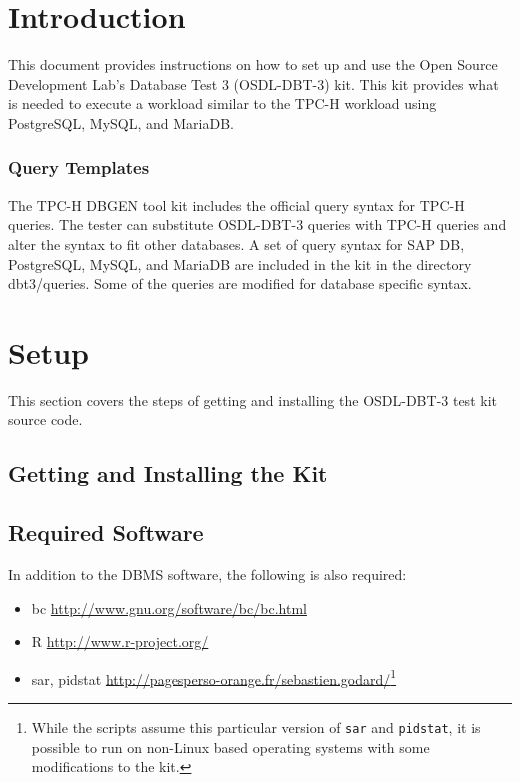 \documentclass{article}
\begin{document}
\pagebreak

\tableofcontents

\section{Introduction}

This document provides instructions on how to set up and use the
Open Source Development Lab's Database Test 3
(OSDL-DBT-3) kit.  This kit provides what is needed to execute a
workload similar to the TPC-H workload using PostgreSQL, MySQL, and MariaDB.

\subsubsection{Query Templates}

The TPC-H DBGEN tool kit includes the official query syntax for TPC-H
queries.  The tester can substitute OSDL-DBT-3 queries with TPC-H
queries and alter the syntax to fit other databases.  A set of query
syntax for SAP DB, PostgreSQL, MySQL, and MariaDB are included in the kit in the directory
dbt3/queries.  Some of the queries are modified for database specific syntax.

\section{Setup}

This section covers the steps of getting and installing the OSDL-DBT-3 test kit source code.

\subsection{Getting and Installing the Kit}

\subsection{Required Software}

In addition to the DBMS software, the following is also required:
\begin{itemize}
\item bc \url{http://www.gnu.org/software/bc/bc.html}
\item R \url{http://www.r-project.org/}
\item sar, pidstat \url{http://pagesperso-orange.fr/sebastien.godard/}\footnote{While the scripts assume this particular version of \texttt{sar} and \texttt{pidstat}, it is possible to run on non-Linux based operating systems with some modifications to the kit.}
\end{itemize}
\end{document}
